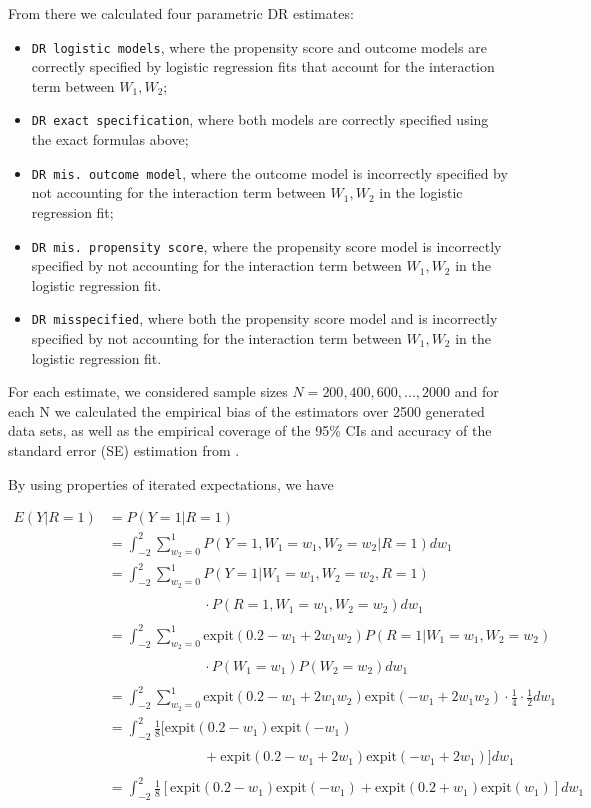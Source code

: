 \documentclass[12pt,twoside]{article}
\newcommand{\expit}{\text{expit}}
\begin{document}
From there we calculated four parametric DR estimates: 
\begin{itemize}
    \item \texttt{DR logistic models}, where the propensity score and outcome models are correctly specified by logistic regression fits that account for the interaction term between $W_1, W_2$;
    \item \texttt{DR exact specification}, where both models are correctly specified using the exact formulas above;
    \item \texttt{DR mis. outcome model}, where the outcome model is incorrectly specified by not accounting for the interaction term between $W_1, W_2$ in the logistic regression fit;
    \item \texttt{DR mis. propensity score}, where the propensity score model is incorrectly specified by not accounting for the interaction term between $W_1, W_2$ in the logistic regression fit.
    \item \texttt{DR misspecified}, where both the propensity score model and is incorrectly specified by not accounting for the interaction term between $W_1, W_2$ in the logistic regression fit.
\end{itemize}

For each estimate, we considered sample sizes $N = 200, 400, 600, ..., 2000$ and for each N we calculated the empirical bias of the estimators over 2500 generated data sets, as well as the empirical coverage of the 95\% CIs and accuracy of the standard error (SE) estimation from \citet{lunceford_davidian}.

By using properties of iterated expectations, we have

\begin{align*}
    E(Y|R = 1) &= P(Y = 1|R = 1)\\
    &= \int_{-2}^{2} \sum_{w_2 = 0}^{1} P(Y = 1, W_1 = w_1, W_2 = w_2|R = 1) dw_1 \\
    & = \int_{-2}^{2} \sum_{w_2 = 0}^{1} P(Y = 1|W_1 = w_1, W_2 = w_2, R = 1) \\
    & \phantom{ = \int_{-2}^{2} \sum_{w_2 = 0}^{1}} \cdot P(R = 1, W_1 = w_1, W_2 = w_2)dw_1 \\
    & = \int_{-2}^{2} \sum_{w_2 = 0}^{1} \expit(0.2 - w_1 + 2w_1w_2)P(R = 1|W_1 = w_1, W_2 = w_2) \\
    &\phantom{ = \int_{-2}^{2} \sum_{w_2 = 0}^{1}} \cdot P(W_1 = w_1)P(W_2 = w_2)dw_1 \\
    & = \int_{-2}^{2} \sum_{w_2 = 0}^{1} \expit(0.2 - w_1 + 2w_1w_2)\expit(-w_1+2w_1w_2) \cdot \frac{1}{4}\cdot \frac{1}{2}dw_1 \\
    & = \int_{-2}^{2} \frac{1}{8}[\expit(0.2 - w_1)\expit(-w_1) \\
    &\phantom{ = \int_{-2}^{2} \sum_{w_2 = 0}^{1}} +\expit(0.2 - w_1 + 2w_1)\expit(-w_1+2w_1)]dw_1 \\
    & = \int_{-2}^{2} \frac{1}{8}[\expit(0.2 - w_1)\expit(-w_1) +\expit(0.2 + w_1)\expit(w_1)]dw_1 \\
\end{align*}
\end{document}
